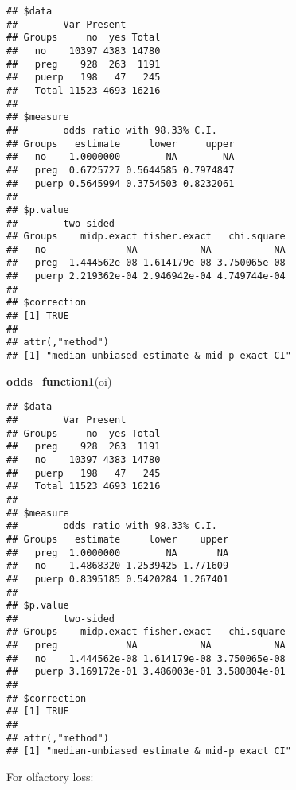 \documentclass[
]{article}
\newenvironment{Shaded}{\begin{snugshade}}{\end{snugshade}}
\newcommand{\DataTypeTok}[1]{\textcolor[rgb]{0.13,0.29,0.53}{#1}}
\newcommand{\KeywordTok}[1]{\textcolor[rgb]{0.13,0.29,0.53}{\textbf{#1}}}
\newcommand{\NormalTok}[1]{#1}
\newcommand{\OperatorTok}[1]{\textcolor[rgb]{0.81,0.36,0.00}{\textbf{#1}}}
\newcommand{\OtherTok}[1]{\textcolor[rgb]{0.56,0.35,0.01}{#1}}
\newcommand{\StringTok}[1]{\textcolor[rgb]{0.31,0.60,0.02}{#1}}
\begin{document}
\begin{verbatim}
## $data
##        Var Present
## Groups     no  yes Total
##   no    10397 4383 14780
##   preg    928  263  1191
##   puerp   198   47   245
##   Total 11523 4693 16216
## 
## $measure
##        odds ratio with 98.33% C.I.
## Groups   estimate     lower     upper
##   no    1.0000000        NA        NA
##   preg  0.6725727 0.5644585 0.7974847
##   puerp 0.5645994 0.3754503 0.8232061
## 
## $p.value
##        two-sided
## Groups    midp.exact fisher.exact   chi.square
##   no              NA           NA           NA
##   preg  1.444562e-08 1.614179e-08 3.750065e-08
##   puerp 2.219362e-04 2.946942e-04 4.749744e-04
## 
## $correction
## [1] TRUE
## 
## attr(,"method")
## [1] "median-unbiased estimate & mid-p exact CI"
\end{verbatim}

\begin{Shaded}
\begin{Highlighting}[]
\KeywordTok{odds_function1}\NormalTok{(oi)}
\end{Highlighting}
\end{Shaded}

\begin{verbatim}
## $data
##        Var Present
## Groups     no  yes Total
##   preg    928  263  1191
##   no    10397 4383 14780
##   puerp   198   47   245
##   Total 11523 4693 16216
## 
## $measure
##        odds ratio with 98.33% C.I.
## Groups   estimate     lower    upper
##   preg  1.0000000        NA       NA
##   no    1.4868320 1.2539425 1.771609
##   puerp 0.8395185 0.5420284 1.267401
## 
## $p.value
##        two-sided
## Groups    midp.exact fisher.exact   chi.square
##   preg            NA           NA           NA
##   no    1.444562e-08 1.614179e-08 3.750065e-08
##   puerp 3.169172e-01 3.486003e-01 3.580804e-01
## 
## $correction
## [1] TRUE
## 
## attr(,"method")
## [1] "median-unbiased estimate & mid-p exact CI"
\end{verbatim}

For olfactory loss:

\begin{Shaded}
\end{Shaded}
\end{document}
